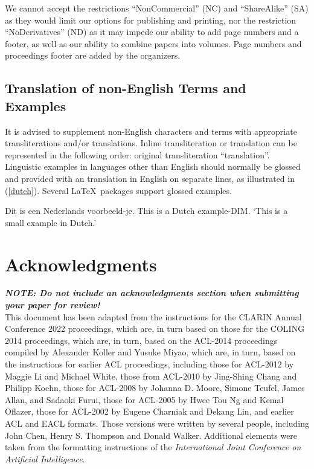 \documentclass[a4paper,11pt]{article}
\begin{document}
We cannot accept the restrictions ``NonCommercial'' (NC) and
``ShareAlike'' (SA) as they would
limit our options for publishing and printing,
nor the restriction ``NoDerivatives'' (ND) as it may impede our
ability to add page numbers and a footer, as well as our ability
to combine papers into volumes.
Page numbers and proceedings footer are added by the organizers.


\subsection{Translation of non-English Terms and Examples}

It is advised to supplement non-English characters and terms
with appropriate transliterations and/or translations.
Inline transliteration or translation can be represented in
the following order: original transliteration ``translation''.\\

Linguistic examples in languages other than English should normally be glossed
and provided with an translation in English on separate lines, as illustrated in (\ref{dutch}).
Several \LaTeX\ packages support glossed examples.

\begin{examples}
\item \label{dutch}
\gll Dit is een Nederlands voorbeeld-je.
This is a Dutch example-DIM.
\glt `This is a small example in Dutch.'
\glend
\end{examples}


\section*{Acknowledgments}

\textbf{\emph{NOTE: Do not include an acknowledgments section when submitting your paper for review!}}\\

This document has been adapted from the instructions for the 
CLARIN Annual Conference 2022 proceedings, which are, in turn based on those for the COLING 2014 proceedings, which are, in turn, based on the ACL-2014
proceedings compiled by Alexander Koller and Yusuke Miyao,
which are, in turn, based on the instructions for earlier ACL proceedings,
including those for ACL-2012 by Maggie Li and Michael
White, those from ACL-2010 by Jing-Shing Chang and Philipp Koehn,
those for ACL-2008 by Johanna D. Moore, Simone Teufel, James Allan,
and Sadaoki Furui, those for ACL-2005 by Hwee Tou Ng and Kemal
Oflazer, those for ACL-2002 by Eugene Charniak and Dekang Lin, and
earlier ACL and EACL formats. Those versions were written by several
people, including John Chen, Henry S. Thompson and Donald
Walker. Additional elements were taken from the formatting
instructions of the {\em International Joint Conference on Artificial
  Intelligence}.

\printbibliography
\end{document}
